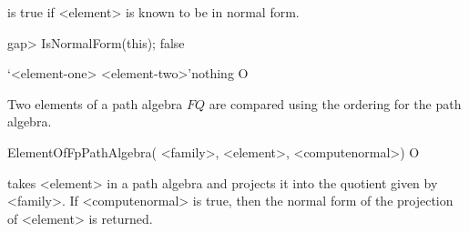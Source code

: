 is true if <element> is known to be in normal form.

\beginexample
gap> IsNormalForm(this);
false
\endexample

\>`<element-one> \< <element-two>'{nothing} O

Two elements of a path algebra $FQ$ are compared
using the ordering for the path algebra.

\>ElementOfFpPathAlgebra( <family>, <element>, <computenormal>) O

takes <element> in a path algebra and projects it into the quotient
given by <family>.
If <computenormal> is true,
then the normal form of the projection of <element> is returned.

